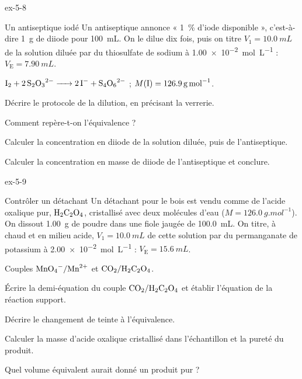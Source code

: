 \begin{blocLivre}{ex-5-8}
\begin{exercice}[2]{Un antiseptique iodé}
Un antiseptique annonce « 1~\% d'iode disponible », c'est-à-dire \qty{1}{g} de diiode pour \qty{100}{mL}. On le dilue dix fois, puis on
titre $V_1=\qty{10,0}{mL}$ de la solution diluée par du thiosulfate de sodium à \qty{1,00e-2}{mol.L^{-1}} : $V_\mathrm{E}=\qty{7,90}{mL}$.
\begin{donnees}
$\ce{I2 + 2S2O3^{2-} -> 2I- + S4O6^{2-}}$ ; $M(\ce{I})=\qty{126,9}{g.mol^{-1}}$.
\end{donnees}
\begin{questions}
\item Décrire le protocole de la dilution, en précisant la verrerie.
\item Comment repère-t-on l'équivalence ?
\item Calculer la concentration en diiode de la solution diluée, puis de l'antiseptique.
\item Calculer la concentration en masse de diiode de l'antiseptique et conclure.
\end{questions}
\end{exercice}
\end{blocLivre}
\begin{blocLivre}{ex-5-9}
\begin{exercice}[2]{Contrôler un détachant}
Un détachant pour le bois est vendu comme de l'acide oxalique pur, $\ce{H2C2O4}$, cristallisé avec deux molécules d'eau
($M=\qty{126,0}{g.mol^{-1}}$). On dissout \qty{1,00}{g} de poudre dans une fiole jaugée de \qty{100,0}{mL}. On titre, à chaud et en milieu
acide, $V_1=\qty{10,0}{mL}$ de cette solution par du permanganate de potassium à \qty{2,00e-2}{mol.L^{-1}} : $V_\mathrm{E}=\qty{15,6}{mL}$.
\begin{donnees}
Couples $\ce{MnO4-}/\ce{Mn^{2+}}$ et $\ce{CO2}/\ce{H2C2O4}$.
\end{donnees}
\begin{questions}
\item Écrire la demi-équation du couple $\ce{CO2}/\ce{H2C2O4}$ et établir l'équation de la réaction support.
\item Décrire le changement de teinte à l'équivalence.
\item Calculer la masse d'acide oxalique cristallisé dans l'échantillon et la pureté du produit.
\item Quel volume équivalent aurait donné un produit pur ?
\end{questions}
\end{exercice}
\end{blocLivre}
